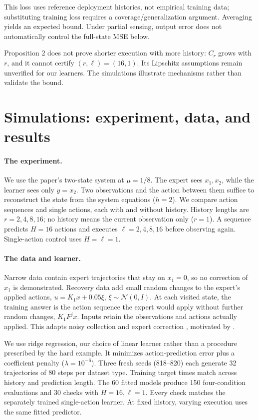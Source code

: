 \documentclass{l4dc2026}
\begin{document}
This loss uses reference deployment histories, not empirical training data; substituting training loss requires a coverage/generalization argument. Averaging yields an expected bound. Under partial sensing, output error does not automatically control the full-state MSE below.

Proposition 2 does not prove shorter execution with more history: $C_r$ grows with $r$, and it cannot certify $(r,\ell)=(16,1)$. Its Lipschitz assumptions remain unverified for our learners. The simulations illustrate mechanisms rather than validate the bound.

\section{Simulations: experiment, data, and results}
\paragraph{The experiment.}
We use the paper's two-state system at $\mu=1/8$. The expert sees $x_1,x_2$, while the learner sees only $y=x_2$. Two observations and the action between them suffice to reconstruct the state from the system equations ($h=2$). We compare action sequences and single actions, each with and without history. History lengths are $r=2,4,8,16$; no history means the current observation only ($r=1$). A sequence predicts $H=16$ actions and executes $\ell=2,4,8,16$ before observing again. Single-action control uses $H=\ell=1$.

\paragraph{The data and learner.}
Narrow data contain expert trajectories that stay on $x_1=0$, so no correction of $x_1$ is demonstrated. Recovery data add small random changes to the expert's applied actions, $u=K_1x+0.05\xi$, $\xi\sim\mathcal N(0,I)$. At each visited state, the training answer is the action sequence the expert would apply without further random changes, $K_1F^jx$. Inputs retain the observations and actions actually applied. This adapts noisy collection and expert correction \citep{laskey2017,ross2011}, motivated by \citet{zhang2025}.

We use ridge regression, our choice of linear learner rather than a procedure prescribed by the hard example. It minimizes action-prediction error plus a coefficient penalty ($\lambda=10^{-6}$). Three fresh seeds (818--820) each generate 32 trajectories of 80 steps per dataset type. Training target times match across history and prediction length. The 60 fitted models produce 150 four-condition evaluations and 30 checks with $H=16,\ell=1$. Every check matches the separately trained single-action learner. At fixed history, varying execution uses the same fitted predictor.
\end{document}
